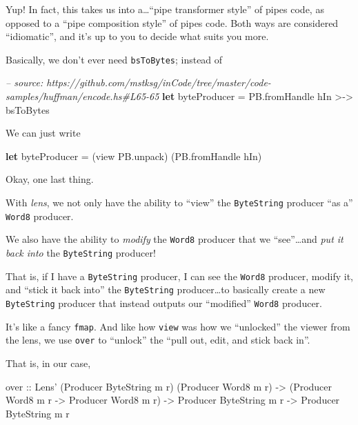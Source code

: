 \documentclass[]{article}
\newenvironment{Shaded}{}{}
\newcommand{\KeywordTok}[1]{\textcolor[rgb]{0.00,0.44,0.13}{\textbf{{#1}}}}
\newcommand{\DataTypeTok}[1]{\textcolor[rgb]{0.56,0.13,0.00}{{#1}}}
\newcommand{\CommentTok}[1]{\textcolor[rgb]{0.38,0.63,0.69}{\textit{{#1}}}}
\newcommand{\OtherTok}[1]{\textcolor[rgb]{0.00,0.44,0.13}{{#1}}}
\newcommand{\FunctionTok}[1]{\textcolor[rgb]{0.02,0.16,0.49}{{#1}}}
\newcommand{\NormalTok}[1]{{#1}}
\begin{document}
Yup! In fact, this takes us into a\ldots{}``pipe transformer style'' of
pipes code, as opposed to a ``pipe composition style'' of pipes code.
Both ways are considered ``idiomatic'', and it's up to you to decide
what suits you more.

Basically, we don't ever need \texttt{bsToBytes}; instead of

\begin{Shaded}
\begin{Highlighting}[]
\CommentTok{-- source: https://github.com/mstksg/inCode/tree/master/code-samples/huffman/encode.hs#L65-65}
    \KeywordTok{let} \NormalTok{byteProducer }\FunctionTok{=} \NormalTok{PB.fromHandle hIn }\FunctionTok{>->} \NormalTok{bsToBytes}
\end{Highlighting}
\end{Shaded}

We can just write

\begin{Shaded}
\begin{Highlighting}[]
\KeywordTok{let} \NormalTok{byteProducer }\FunctionTok{=} \NormalTok{(view PB.unpack) (PB.fromHandle hIn)}
\end{Highlighting}
\end{Shaded}

Okay, one last thing.

With \emph{lens}, we not only have the ability to ``view'' the
\texttt{ByteString} producer ``as a'' \texttt{Word8} producer.

We also have the ability to \emph{modify} the \texttt{Word8} producer
that we ``see''\ldots{}and \emph{put it back into} the
\texttt{ByteString} producer!

That is, if I have a \texttt{ByteString} producer, I can see the
\texttt{Word8} producer, modify it, and ``stick it back into'' the
\texttt{ByteString} producer\ldots{}to basically create a new
\texttt{ByteString} producer that instead outputs our ``modified''
\texttt{Word8} producer.

It's like a fancy \texttt{fmap}. And like how \texttt{view} was how we
``unlocked'' the viewer from the lens, we use \texttt{over} to
``unlock'' the ``pull out, edit, and stick back in''.

That is, in our case,

\begin{Shaded}
\begin{Highlighting}[]
\OtherTok{over ::} \DataTypeTok{Lens'} \NormalTok{(}\DataTypeTok{Producer} \DataTypeTok{ByteString} \NormalTok{m r) (}\DataTypeTok{Producer} \DataTypeTok{Word8} \NormalTok{m r)}
     \OtherTok{->} \NormalTok{(}\DataTypeTok{Producer} \DataTypeTok{Word8} \NormalTok{m r }\OtherTok{->} \DataTypeTok{Producer} \DataTypeTok{Word8} \NormalTok{m r)}
     \OtherTok{->} \DataTypeTok{Producer} \DataTypeTok{ByteString} \NormalTok{m r}
     \OtherTok{->} \DataTypeTok{Producer} \DataTypeTok{ByteString} \NormalTok{m r}
\end{Highlighting}
\end{Shaded}
\end{document}
